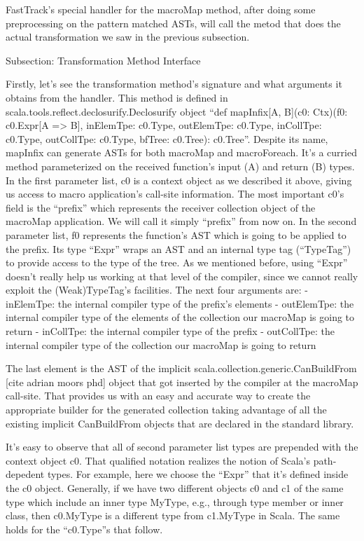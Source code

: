 FastTrack's special handler for the macroMap method, after
doing some preprocessing on the pattern matched ASTs, will call the metod
that does the actual transformation we saw in the previous subsection. 


Subsection: Transformation Method Interface

Firstly, let's see the transformation method's signature and what arguments it
obtains from the handler. This method is defined in
scala.tools.reflect.declosurify.Declosurify object ``def mapInfix[A, B](c0:
Ctx)(f0: c0.Expr[A => B], inElemTpe: c0.Type, outElemTpe: c0.Type, inCollTpe:
c0.Type, outCollTpe: c0.Type, bfTree: c0.Tree): c0.Tree''. Despite its name,
mapInfix can generate ASTs for both macroMap and macroForeach. It's a curried
method parameterized on the received function's input (A) and return (B) types.
In the first parameter list, c0 is a context object as we described it above,
giving us access to macro application's call-site information. The most
important c0's field is the ``prefix'' which represents the receiver collection
object of the macroMap application. We will call it simply ``prefix''
from now on. In the second parameter
list, f0 represents the function's AST which is going to be applied to the
prefix. Its type ``Expr'' wraps an AST and an internal type tag
(``TypeTag'') to provide access to the type of the tree. As we mentioned
before, using ``Expr'' doesn't really help us working at that level of the
compiler, since we cannot really exploit the (Weak)TypeTag's facilities. The
next four arguments are:
 - inElemTpe: the internal compiler type of the prefix's elements
 - outElemTpe: the internal compiler type of the elements of the collection our
macroMap
is going to return
- inCollTpe: the internal compiler type of the prefix
- outCollTpe: the internal compiler type of the collection our macroMap is going
to return

The last element is the AST of the implicit
scala.collection.generic.CanBuildFrom [cite adrian moors phd] object that got
inserted by the compiler at the macroMap call-site. That provides us with an
easy and accurate way to create the appropriate builder for the generated
collection taking advantage of all the existing implicit CanBuildFrom objects
that are declared in the standard library.

It's easy to observe that all of second parameter list types are prepended
with the context object c0. That qualified notation realizes the notion of
Scala's path-depedent types. For example, here we choose the ``Expr'' that it's
defined inside the c0 object. Generally, if we have two different objects c0 and
c1 of the same type which include an inner type MyType, e.g., through type
member or inner class,  then c0.MyType is a different type from c1.MyType in
Scala. The same holds for the ``c0.Type''s that follow.


